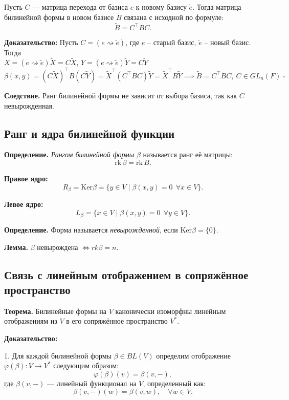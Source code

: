 \documentclass[12pt]{article}
\begin{document}
Пусть $C$ — матрица перехода от базиса $e$ к новому базису $\tilde{e}$. Тогда матрица билинейной формы в новом базисе $\tilde{B}$ связана с исходной по формуле:
\[
\tilde{B} = C^\top B C.
\]

\textbf{Доказательство:}
Пусть $C=(e \rightsquigarrow \tilde{e})$, где $e$ – старый базис, $\tilde{e}$ – новый базис. Тогда\\
$X = (e \rightsquigarrow \tilde{e}) \tilde{X} = C\tilde{X}$, $Y = (e \rightsquigarrow \tilde{e}) \tilde{Y} = C\tilde{Y}$\\
$\beta(x,y)=(C \tilde{X})^\top B(C\tilde{Y})=\tilde{X}^\top(C^\top BC)\tilde{Y}=\tilde{X}^\top B\tilde{Y} \implies \tilde{B} = C^\top BC, \ C \in GL_n(F) \ \square$

\textbf{Следствие.} Ранг билинейной формы не зависит от выбора базиса, так как $C$ невырожденная.

\subsection{Ранг и ядра билинейной функции}

\textbf{Определение.} \textit{Рангом билинейной формы} $\beta$ называется ранг её матрицы:
\[
\mathrm{rk}\, \beta = \mathrm{rk}\, B.
\]

\textbf{Правое ядро:}
\[
R_\beta =\mathrm{Ker} \beta = \{ y \in V \mid \beta(x, y) = 0 \ \ \forall x \in V \}.
\]

\textbf{Левое ядро:}
\[
L_ \beta = \{ x \in V \mid \beta(x, y) = 0 \ \ \forall y \in V \}.
\]

\textbf{Определение.} Форма называется \textit{невырожденной}, если $\mathrm{Ker} \beta = \{0\}$.

\textbf{Лемма.} $\beta{} \text{ невырождена } \Longleftrightarrow rk\beta=n.$

\subsection{Связь с линейным отображением в сопряжённое пространство}

\textbf{Теорема.} Билинейные формы на $V$ канонически изоморфны линейным отображениям из $V$ в его сопряжённое пространство $V^*$.

\textbf{Доказательство:}

1. Для каждой билинейной формы $\beta \in BL(V)$ определим отображение $\varphi(\beta): V \to V^*$ следующим образом:
     $$
     \varphi(\beta)(v) = \beta(v, -),
     $$
     где $\beta(v, -)$ — линейный функционал на $V$, определенный как:
     $$
     \beta(v, -)(w) = \beta(v, w), \quad \forall w \in V.
     $$
\end{document}
